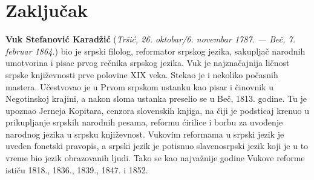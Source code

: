 \documentclass[12pt,oneside]{memoir}
\begin{document}
\chapter{Zaključak}
\pangrami

\pangrami

\literatura

\backmatter

\begin{biografija}
  \textbf{Vuk Stefanović Karadžić} (\emph{Tršić,
    26. oktobar/6. novembar 1787. — Beč, 7. februar 1864.}) bio je
  srpski filolog, reformator srpskog jezika, sakupljač narodnih
  umotvorina i pisac prvog rečnika srpskog jezika.  Vuk je
  najznačajnija ličnost srpske književnosti prve polovine XIX
  veka. Stekao je i nekoliko počasnih mastera.  Učestvovao je u
  Prvom srpskom ustanku kao pisar i činovnik u Negotinskoj krajini, a
  nakon sloma ustanka preselio se u Beč, 1813. godine. Tu je upoznao
  Jerneja Kopitara, cenzora slovenskih knjiga, na čiji je podsticaj
  krenuo u prikupljanje srpskih narodnih pesama, reformu ćirilice i
  borbu za uvođenje narodnog jezika u srpsku književnost. Vukovim
  reformama u srpski jezik je uveden fonetski pravopis, a srpski jezik
  je potisnuo slavenosrpski jezik koji je u to vreme bio jezik
  obrazovanih ljudi. Tako se kao najvažnije godine Vukove reforme
  ističu 1818., 1836., 1839., 1847. i 1852.
\end{biografija}
\end{document}
